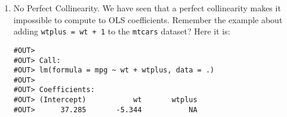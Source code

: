 \documentclass[]{book}
\newenvironment{Shaded}{\begin{snugshade}}{\end{snugshade}}
\newcommand{\DataTypeTok}[1]{\textcolor[rgb]{0.13,0.29,0.53}{#1}}
\newcommand{\DecValTok}[1]{\textcolor[rgb]{0.00,0.00,0.81}{#1}}
\newcommand{\KeywordTok}[1]{\textcolor[rgb]{0.13,0.29,0.53}{\textbf{#1}}}
\newcommand{\NormalTok}[1]{#1}
\newcommand{\OperatorTok}[1]{\textcolor[rgb]{0.81,0.36,0.00}{\textbf{#1}}}
\newcommand{\StringTok}[1]{\textcolor[rgb]{0.31,0.60,0.02}{#1}}
\begin{document}
\begin{enumerate}
\def\labelenumi{\arabic{enumi}.}
\item
  No Perfect Collinearity. We have seen that a perfect collinearity makes it impossible to compute to OLS coefficients. Remember the example about adding \texttt{wtplus\ =\ wt\ +\ 1} to the \texttt{mtcars} dataset? Here it is:

\begin{Shaded}
\end{Shaded}

\begin{verbatim}
#OUT> 
#OUT> Call:
#OUT> lm(formula = mpg ~ wt + wtplus, data = .)
#OUT> 
#OUT> Coefficients:
#OUT> (Intercept)           wt       wtplus  
#OUT>      37.285       -5.344           NA
\end{verbatim}


\end{enumerate}
\end{document}
